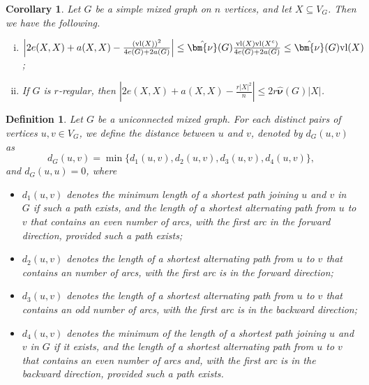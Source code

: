 \documentclass[12pt]{article}
\numberwithin{equation}{section}
\newtheorem{cor}{Corollary}[section]
\newtheorem{defn}{Definition}[section]
\begin{document}
	\begin{cor}
		Let $G$ be a simple mixed graph on $n$ vertices, and let $X\subseteq V_G$. Then we have the following.
		\begin{enumerate}[(i)]
			\item $\left|2e(X,X)+a(X,X)-\frac{(\textnormal{vl}(X))^2}{4e(G)+2a(G)}\right|\leq \hat{\bm{\nu}}(G)\frac{\textnormal{vl}(X)\textnormal{vl}(X^c)}{4e(G)+2a(G)}\leq \hat{\bm{\nu}}(G)\textnormal{vl}(X)$;
			\item If $G$ is $r$-regular, then $\left|2e(X,X)+a(X,X)-\frac{r|X|^2}{n}\right|\leq 2r\hat{\bm{\nu}}(G)|X|$.
		\end{enumerate}
	\end{cor}
	\begin{defn}\normalfont
		Let $G$ be a uniconnected mixed graph. For each distinct pairs of vertices $u,v\in V_G$, we define the \textit{distance} between $u$ and $v$, denoted by $d_G(u,v)$ as $$d_G(u,v)=\min\{d_1(u,v),d_2(u,v),d_3(u,v),d_4(u,v)\},$$ and $d_G(u,u)=0$, where
		\begin{itemize}
			\item $d_1(u,v)$ denotes  the minimum length of a shortest path joining $u$ and $v$ in $G$ if such a path exists, and the length of a shortest alternating path from $u$ to $v$ that contains an  even number of arcs, with the first arc in the forward direction, provided such a path exists;
			\item $d_2(u,v)$ denotes the length of a shortest alternating path from $u$ to $v$ that contains an number of arcs, with  the first arc is in the forward direction;
			\item $d_3(u,v)$ denotes the length of a shortest alternating path from $u$ to $v$ that contains an odd number of arcs, with  the first arc is in the backward direction;
			\item $d_4(u,v)$ denotes the minimum of the length of a shortest path joining $u$ and $v$ in $G$ if it exists, and the length of a shortest alternating path from $u$ to $v$ that contains an even number of arcs and, with  the first arc is in the backward direction, provided such a path exists.
		\end{itemize}
	\end{defn}
	
\end{document}
